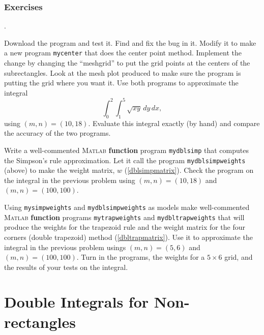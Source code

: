 




\subsection*{Exercises}
\begin{list}
{.}{}

\item Download the program  and test it.
  Find and fix the bug in it.
  Modify it to make a new program \verb&mycenter& that does the center
  point method. Implement the change by changing the ``meshgrid'' to
  put the grid points at the centers of the subrectangles. Look at the
  mesh plot produced to make sure the program is putting the grid
  where you want it. Use both programs to approximate the integral
  $$
  \int_0^2 \int_1^5 \sqrt{xy} \, dy \, dx,
  $$
  using $(m,n) = (10,18)$.  Evaluate this integral exactly (by hand) and compare
  the accuracy of the two programs.

\item Write a well-commented \textsc{Matlab} {\bf function} program
  \verb&mydblsimp& that computes the Simpson's rule approximation. Let
  it call the program \verb&mydblsimpweights& (above) to make the weight
  matrix, $w$ (\ref{dblsimpmatrix}). Check the program on
  the integral in the previous problem using  $(m,n) = (10,18)$ and $(m,n) = (100,100)$.

\item Using \verb&mysimpweights& and \verb&mydblsimpweights& as models
  make well-commented \textsc{Matlab} {\bf function} programs
  \verb&mytrapweights& and \verb&mydbltrapweights& that will produce
  the weights for the trapezoid rule and the weight matrix for the
  four corners (double trapezoid) method (\ref{dbltrapmatrix}). 
  Use it to approximate the integral in the previous problem usings  $(m,n) = (5,6)$ and $(m,n) = (100,100)$.
  Turn in the programs, the weights for a $5\times 6$ grid, and the results of your tests on the integral.

\end{list}


\chapter{Double Integrals for Non-rectangles}


